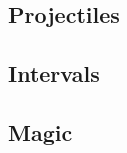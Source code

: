 \begin{multicols}{2}


\commonArmourChart

\subsection*{Projectiles}



\subsection*{Intervals}



\subsection*{Magic}



\end{multicols}
